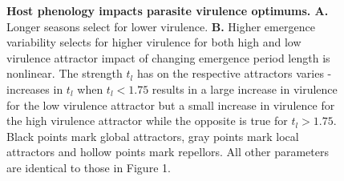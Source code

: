 \documentclass{article}
\begin{document}
\begin{figure}[hb!]
  \centering
    \begin{subfigure}[t]{0.45\textwidth}
      \centering
  \end{subfigure}\hspace{1cm}
  \begin{subfigure}[t]{0.45\textwidth}\hspace{0cm}
  \end{subfigure}\hspace{1.5cm}
    \caption{\textbf{Host phenology impacts parasite virulence optimums. A.} Longer seasons select for lower virulence. \textbf{B.} Higher emergence variability selects for higher virulence for both high and low virulence attractor impact of changing emergence period length is nonlinear. The strength $t_{l}$ has on the respective attractors varies - increases in $t_{l}$ when $t_{l}< 1.75$ results in a large increase in virulence for the low virulence attractor but a small increase in virulence for the high virulence attractor while the opposite is true for $t_{l}> 1.75$. Black points mark global attractors, gray points mark local attractors and hollow points mark repellors. All other parameters are identical to those in Figure 1. 
    }
\end{figure}
\end{document}
